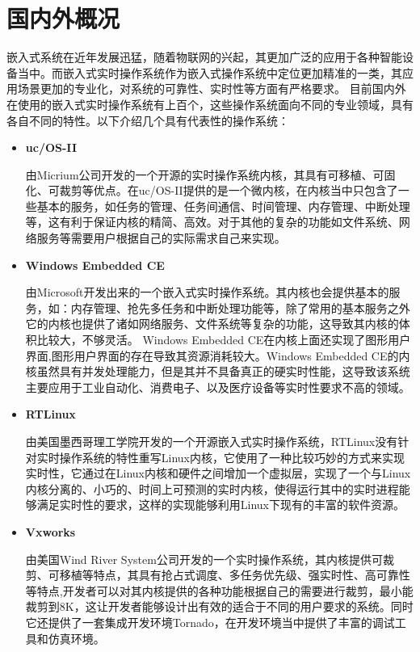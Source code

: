 \section{国内外概况}
	嵌入式系统在近年发展迅猛，随着物联网的兴起，其更加广泛的应用于各种智能设备当中。而嵌入式实时操作系统作为嵌入式操作系统中定位更加精准的一类，其应用场景更加的专业化\cite{解月江2004VxWorks设备驱动技术研究}\cite{VxWorks嵌入式实时操作系统的结构研究}，对系统的可靠性、实时性等方面有严格要求。
	目前国内外在使用的嵌入式实时操作系统有上百个，这些操作系统面向不同的专业领域，具有各自不同的特性。以下介绍几个具有代表性的操作系统：
\begin{itemize}
\item \textbf{uc/OS-II}
	
	由Micrium公司开发的一个开源的实时操作系统内核，其具有可移植、可固化、可裁剪等优点\cite{Wu2008Implementation}。在uc/OS-II提供的是一个微内核，在内核当中只包含了一些基本的服务，如任务的管理、任务间通信、时间管理、内存管理、中断处理等\cite{马增炜2011基于}\cite{Zhang2010Design}，这有利于保证内核的精简、高效。对于其他的复杂的功能如文件系统、网络服务等需要用户根据自己的实际需求自己来实现。
	
	
\item \textbf{Windows Embedded CE}

	由Microsoft开发出来的一个嵌入式实时操作系统。其内核也会提供基本的服务，如：内存管理、抢先多任务和中断处理功能等，除了常用的基本服务之外它的内核也提供了诸如网络服务、文件系统等复杂的功能，这导致其内核的体积比较大，不够灵活。
	Windows Embedded CE在内核上面还实现了图形用户界面,图形用户界面的存在导致其资源消耗较大\cite{徐媛媛2003嵌入式实时操作系统的设备驱动}\cite{谢强2007基于}。Windows Embedded CE的内核虽然具有并发处理能力，但是其并不具备真正的硬实时性能，这导致该系统主要应用于工业自动化、消费电子、以及医疗设备等实时性要求不高的领域。
	
\item \textbf{RTLinux}
	
	由美国墨西哥理工学院开发的一个开源嵌入式实时操作系统，RTLinux没有针对实时操作系统的特性重写Linux内核，它使用了一种比较巧妙的方式来实现实时性，它通过在Linux内核和硬件之间增加一个虚拟层，实现了一个与Linux内核分离的、小巧的、时间上可预测的实时内核，使得运行其中的实时进程能够满足实时性的要求\cite{郭春生2002硬实时操作系统}，这样的实现能够利用Linux下现有的丰富的软件资源\cite{Zhu2004RTLinux}。
\item \textbf{Vxworks}

	由美国Wind River System公司开发的一个实时操作系统，其内核提供可裁剪、可移植等特点，其具有抢占式调度、多任务优先级、强实时性、高可靠性等特点\cite{李立志2003实时操作系统}\cite{陈洋2007VxWorks},开发者可以对其内核提供的各种功能根据自己的需要进行裁剪，最小能裁剪到8K，这让开发者能够设计出有效的适合于不同的用户要求的系统\cite{谢强2007基于}\cite{徐媛媛2003嵌入式实时操作系统的设备驱动}。同时它还提供了一套集成开发环境Tornado，在开发环境当中提供了丰富的调试工具和仿真环境。	
\end{itemize}	
		

